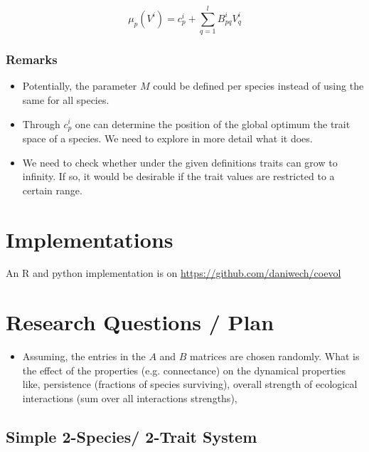 \documentclass[
12.5pt, 					%
a4paper, 				%
oneside,					%
headinclude,footinclude, %
BCOR5mm, 				%
abstract=on
]{scrreprt}
\numberwithin{equation}{chapter}
\begin{document}
\begin{equation}
\label{eq:fitness_function_epistatic_effect}
\mu_p(V^i) = c_p^i + \sum_{q=1}^l B_{pq}^i V^i_q
\end{equation}

\subsubsection*{Remarks}

\begin{itemize}
\item
Potentially, the parameter $M$ could be defined per species instead of using the same for all species.

\item
Through $c_p^i$ one can determine the position of the global optimum the trait space of a species. We need to explore in more detail what it does.

\item
We need to check whether under the given definitions traits can grow to infinity.
If so, it would be desirable if the trait values are restricted to a certain range.


\end{itemize}


\section{Implementations}

An R and python implementation is on \url{https://github.com/daniwech/coevol}

\section*{Research Questions / Plan}

\begin{itemize}
\item Assuming, the entries in the $A$ and $B$ matrices are chosen randomly.
What is the effect of the properties (e.g. connectance) on the dynamical properties like,
persistence (fractions of species surviving), overall strength of ecological interactions
(sum over all interactions strengths), 
\newline

\end{itemize}

\subsection{Simple 2-Species/ 2-Trait System}
\end{document}
